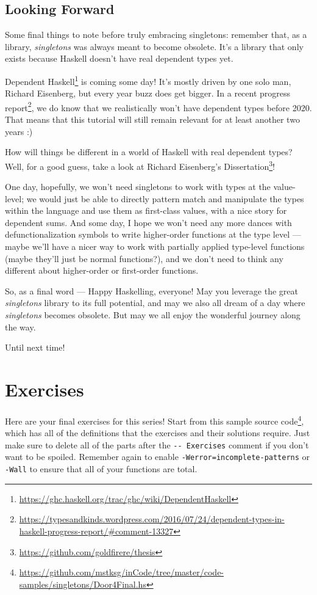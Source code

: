 \documentclass[]{article}
\renewcommand{\href}[2]{#2\footnote{\url{#1}}}
\begin{document}
\subsection{Looking Forward}\label{looking-forward}

Some final things to note before truly embracing singletons: remember that, as a
library, \emph{singletons} was always meant to become obsolete. It's a library
that only exists because Haskell doesn't have real dependent types yet.

\href{https://ghc.haskell.org/trac/ghc/wiki/DependentHaskell}{Dependent Haskell}
is coming some day! It's mostly driven by one solo man, Richard Eisenberg, but
every year buzz does get bigger. In a
\href{https://typesandkinds.wordpress.com/2016/07/24/dependent-types-in-haskell-progress-report/\#comment-13327}{recent
progress report}, we do know that we realistically won't have dependent types
before 2020. That means that this tutorial will still remain relevant for at
least another two years :)

How will things be different in a world of Haskell with real dependent types?
Well, for a good guess, take a look at
\href{https://github.com/goldfirere/thesis}{Richard Eisenberg's Dissertation}!

One day, hopefully, we won't need singletons to work with types at the
value-level; we would just be able to directly pattern match and manipulate the
types within the language and use them as first-class values, with a nice story
for dependent sums. And some day, I hope we won't need any more dances with
defunctionalization symbols to write higher-order functions at the type level
--- maybe we'll have a nicer way to work with partially applied type-level
functions (maybe they'll just be normal functions?), and we don't need to think
any different about higher-order or first-order functions.

So, as a final word --- Happy Haskelling, everyone! May you leverage the great
\emph{singletons} library to its full potential, and may we also all dream of a
day where \emph{singletons} becomes obsolete. But may we all enjoy the wonderful
journey along the way.

Until next time!

\section{Exercises}\label{exercises}

Here are your final exercises for this series! Start from
\href{https://github.com/mstksg/inCode/tree/master/code-samples/singletons/Door4Final.hs}{this
sample source code}, which has all of the definitions that the exercises and
their solutions require. Just make sure to delete all of the parts after the
\texttt{-\/-\ Exercises} comment if you don't want to be spoiled. Remember again
to enable \texttt{-Werror=incomplete-patterns} or \texttt{-Wall} to ensure that
all of your functions are total.
\end{document}
